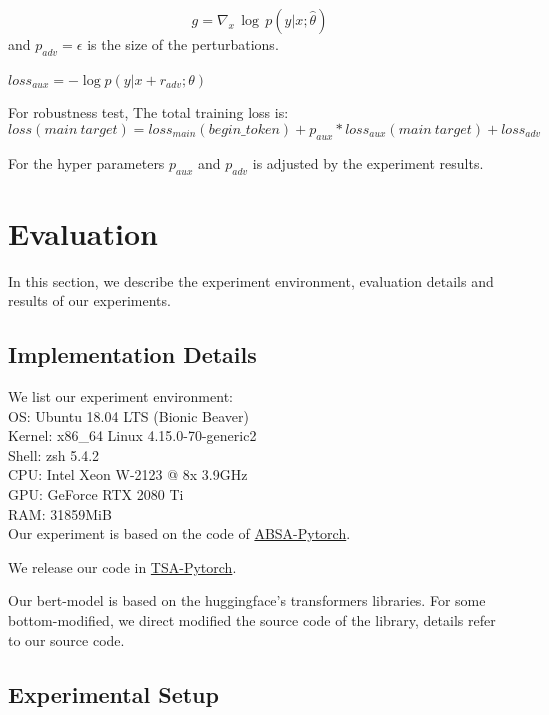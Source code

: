 \documentclass[fyp]{socreport}
\begin{document}
\begin{equation}
    g = \nabla_{x}\, \log\,  p(y|x;\hat{\theta})
\end{equation} and $p_{adv}=\epsilon$ is the size of the perturbations.

\begin{center}
	$loss_{aux}=- \log p(y|x + r_{adv};\theta)$
\end{center}

For robustness test, 
The total training loss is:  
\begin{equation}
    loss(main\ target)=loss_{main}(begin\_{token})+p_{aux}*loss_{aux}(main\ target)+loss_{adv}
\end{equation}


For the hyper parameters $p_{aux}$ and $p_{adv}$ is adjusted by the experiment results.

\chapter{Evaluation}
In this section, we describe the experiment environment, evaluation details and results of our experiments.

\section{Implementation Details}

We list our experiment environment: \\
OS: Ubuntu 18.04 LTS (Bionic Beaver)\\
Kernel: x86\_64 Linux 4.15.0-70-generic2\\
Shell: zsh 5.4.2\\
CPU: Intel Xeon W-2123 @ 8x 3.9GHz\\
GPU: GeForce RTX 2080 Ti\\
RAM: 31859MiB \\




Our experiment is based on the code of \href{https://github.com/songyouwei/ABSA-PyTorch}{ABSA-Pytorch}. 

We release our code in \href{https://github.com/Xiang-Pan/TSA-PyTorch}{TSA-Pytorch}.

Our bert-model is based on the huggingface's transformers libraries. For some bottom-modified, we direct modified the source code of the library, details refer to our source code.

\section{Experimental Setup}
\end{document}
